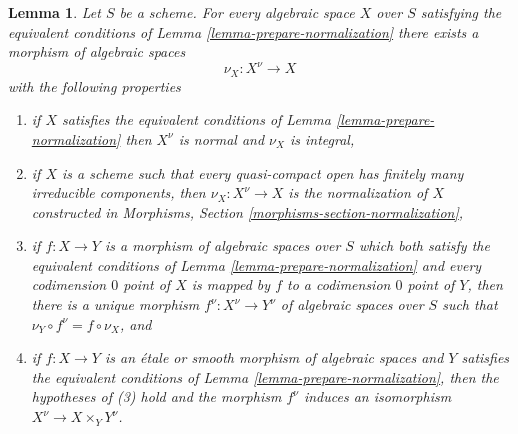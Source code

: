 \documentclass{stacks-project}
\theoremstyle{plain}
\newtheorem{lemma}[subsection]{Lemma}
\theoremstyle{definition}
\theoremstyle{remark}
\numberwithin{equation}{subsection}
\begin{document}
\begin{lemma}
\label{lemma-normalization}
Let $S$ be a scheme. For every algebraic space $X$ over $S$ satisfying
the equivalent conditions of Lemma \ref{lemma-prepare-normalization}
there exists a morphism of algebraic spaces
$$
\nu_X : X^\nu \longrightarrow X
$$
with the following properties
\begin{enumerate}
\item if $X$ satisfies the equivalent conditions of
Lemma \ref{lemma-prepare-normalization} then
$X^\nu$ is normal and $\nu_X$ is integral,
\item if $X$ is a scheme such that every quasi-compact open has finitely
many irreducible components, then $\nu_X : X^\nu \to X$ is the
normalization of $X$ constructed in
Morphisms, Section \ref{morphisms-section-normalization},
\item if $f : X \to Y$ is a morphism of algebraic spaces over $S$
which both satisfy the equivalent conditions of
Lemma \ref{lemma-prepare-normalization} and every codimension $0$
point of $X$ is mapped by $f$ to a codimension $0$ point of $Y$, then
there is a unique morphism $f^\nu : X^\nu \to Y^\nu$ of algebraic
spaces over $S$ such that $\nu_Y \circ f^\nu = f \circ \nu_X$, and
\item if $f : X \to Y$ is an \'etale or smooth morphism of algebraic
spaces and $Y$ satisfies the equivalent conditions of
Lemma \ref{lemma-prepare-normalization}, then the hypotheses of (3)
hold and the morphism $f^\nu$ induces an isomorphism
$X^\nu  \to X \times_Y Y^\nu$.
\end{enumerate}
\end{lemma}
\end{document}
